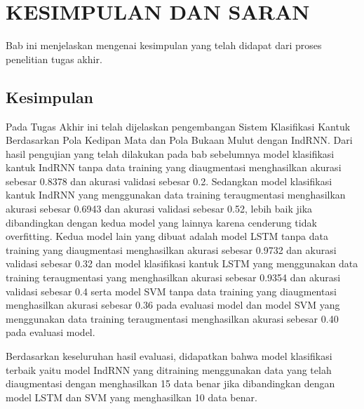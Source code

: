\chapter{KESIMPULAN DAN SARAN}
\label{chap:penutup}

Bab ini menjelaskan mengenai kesimpulan yang telah didapat dari proses penelitian
tugas akhir.

\section{Kesimpulan}
\label{sec:kesimpulan}

Pada Tugas Akhir ini telah dijelaskan pengembangan Sistem Klasifikasi Kantuk Berdasarkan
Pola Kedipan Mata dan Pola Bukaan Mulut dengan IndRNN. Dari hasil pengujian yang telah
dilakukan pada bab sebelumnya model klasifikasi kantuk IndRNN tanpa data training yang diaugmentasi
menghasilkan akurasi sebesar 0.8378 dan akurasi validasi sebesar 0.2. Sedangkan model klasifikasi
kantuk IndRNN yang menggunakan data training teraugmentasi menghasilkan akurasi sebesar 0.6943
dan akurasi validasi sebesar 0.52, lebih baik jika dibandingkan dengan kedua model yang lainnya karena
cenderung tidak overfitting. Kedua model lain yang dibuat adalah model LSTM tanpa data training 
yang diaugmentasi menghasilkan akurasi sebesar 0.9732 dan akurasi validasi sebesar 0.32 dan model 
klasifikasi kantuk LSTM yang menggunakan data training teraugmentasi yang menghasilkan akurasi 
sebesar 0.9354 dan akurasi validasi sebesar 0.4 serta model SVM tanpa data training yang
diaugmentasi menghasilkan akurasi sebesar 0.36 pada evaluasi model dan model 
SVM yang menggunakan data training teraugmentasi menghasilkan akurasi sebesar 
0.40 pada evaluasi model.

Berdasarkan keseluruhan hasil evaluasi, didapatkan bahwa model klasifikasi
terbaik yaitu model IndRNN yang ditraining menggunakan data yang telah diaugmentasi
dengan menghasilkan 15 data benar jika dibandingkan dengan model LSTM dan SVM yang menghasilkan
10 data benar.




